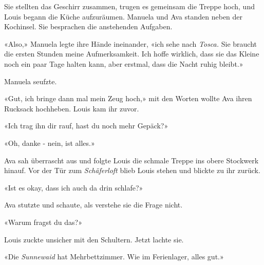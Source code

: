 Sie stellten das Geschirr zusammen, trugen es gemeinsam die Treppe hoch,
und Louis begann die Küche aufzuräumen. Manuela und Ava standen neben
der Kochinsel. Sie besprachen die anstehenden Aufgaben.

«Also,» Manuela legte ihre Hände ineinander, «ich sehe nach
\emph{Tosca.} Sie braucht die ersten Stunden meine Aufmerksamkeit. Ich
hoffe wirklich, dass sie das Kleine noch ein paar Tage halten kann, aber
erstmal, dass die Nacht ruhig bleibt.»

Manuela seufzte.

«Gut, ich bringe dann mal mein Zeug hoch,» mit den Worten wollte Ava
ihren Rucksack hochheben. Louis kam ihr zuvor. 

«Ich trag ihn dir rauf, hast du noch mehr Gepäck?»

«Oh, danke - nein, ist alles.»

Ava sah überrascht aus und folgte Louis die schmale Treppe ins obere
Stockwerk hinauf.
Vor der Tür zum \emph{Schäferloft} blieb Louis stehen und blickte zu ihr
zurück.

«Ist es okay, dass ich auch da drin schlafe?»

Ava stutzte und schaute, als verstehe sie die Frage nicht.

«Warum fragst du das?»

Louis zuckte unsicher mit den Schultern. Jetzt lachte sie.

«Die \emph{Sunnewaid} hat Mehrbettzimmer. Wie im Ferienlager, alles
gut.» 